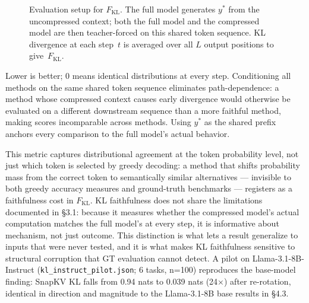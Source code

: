 \documentclass[10pt,letterpaper]{article}
\begin{document}
\begin{figure}[H]
\centering
{}
\caption{Evaluation setup for $F_{\text{KL}}$. The full model generates $y^*$ from the
uncompressed context; both the full model and the compressed model are then teacher-forced on
this shared token sequence. KL divergence at each step~$t$ is averaged over all $L$ output
positions to give~$F_{\text{KL}}$.}
\label{fig:eval-setup}
\end{figure}

Lower is better; 0 means identical distributions at every step.
Conditioning all methods on the same shared token sequence eliminates
path-dependence: a method whose compressed context causes early
divergence would otherwise be evaluated on a different downstream
sequence than a more faithful method, making scores incomparable across
methods. Using \(y^*\) as the shared prefix anchors every comparison to
the full model's actual behavior.

This metric captures distributional agreement at the token probability
level, not just which token is selected by greedy decoding: a method
that shifts probability mass from the correct token to semantically
similar alternatives --- invisible to both greedy accuracy measures and
ground-truth benchmarks --- registers as a faithfulness cost in
\(F_{\text{KL}}\). KL faithfulness does not share the limitations
documented in §3.1: because it measures whether the compressed model's
actual computation matches the full model's at every step, it is
informative about mechanism, not just outcome. This distinction is what
lets a result generalize to inputs that were never tested, and it is
what makes KL faithfulness sensitive to structural corruption that GT
evaluation cannot detect. A pilot on Llama-3.1-8B-Instruct
(\texttt{kl\_instruct\_pilot.json}; 6 tasks, n=100) reproduces the
base-model finding: SnapKV KL falls from 0.94 nats to 0.039 nats
(24×) after re-rotation, identical in direction and magnitude to the
Llama-3.1-8B base results in §4.3.
\end{document}
